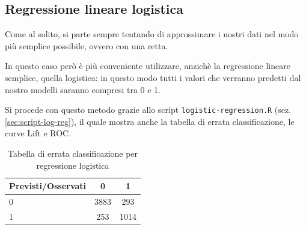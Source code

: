 \subsection{Regressione lineare logistica}\label{sec:class-log-reg}

Come al solito, si parte sempre tentando di approssimare i nostri dati nel
modo più semplice possibile, ovvero con una retta.

In questo caso però è più conveniente utilizzare, anzichè la regressione
lineare semplice, quella logistica: in questo modo tutti i valori che verranno
predetti dal nostro modelli saranno compresi tra 0 e 1.

Si procede con questo metodo grazie allo script \texttt{logistic-regression.R}
(sez. \ref{sec:script-log-reg}), il quale mostra anche la tabella di errata
classificazione, le curve Lift e ROC.

\begin{table}[H]
\begin{center}
\begin{tabular}{ | l || c | c | }
  \hline
    Previsti/Osservati & 0 & 1 \\ \hline \hline
    0 & 3883 & 293 \\ \hline
    1 & 253 & 1014 \\ \hline
\end{tabular}
  \caption{Tabella di errata classificazione per regressione logistica}
\end{center}
\end{table}

